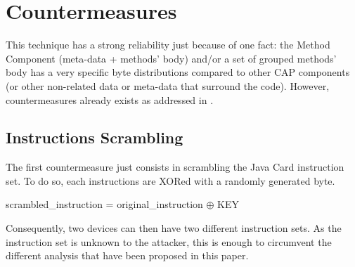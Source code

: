 


\section{Countermeasures}

This technique has a strong reliability just because of one fact: the Method Component (meta-data +
methods' body) and/or a set of grouped methods' body  has a very specific byte distributions compared
to other CAP components (or other non-related data or meta-data that surround the code). However, countermeasures already exists as addressed in \cite{barbuthesis}
\cite{dynamicsyntax}. 

\subsection{Instructions Scrambling}
The first countermeasure just consists in scrambling the Java Card instruction set. To do so, each
instructions are XORed with a randomly generated byte. 
 
 \begin{center}
scrambled\_instruction = original\_instruction $\oplus$ KEY 
\end{center}

Consequently, two devices can then have two different instruction sets. As the instruction set is
unknown to the attacker, this is enough to circumvent the different analysis that have been
proposed in this paper.

